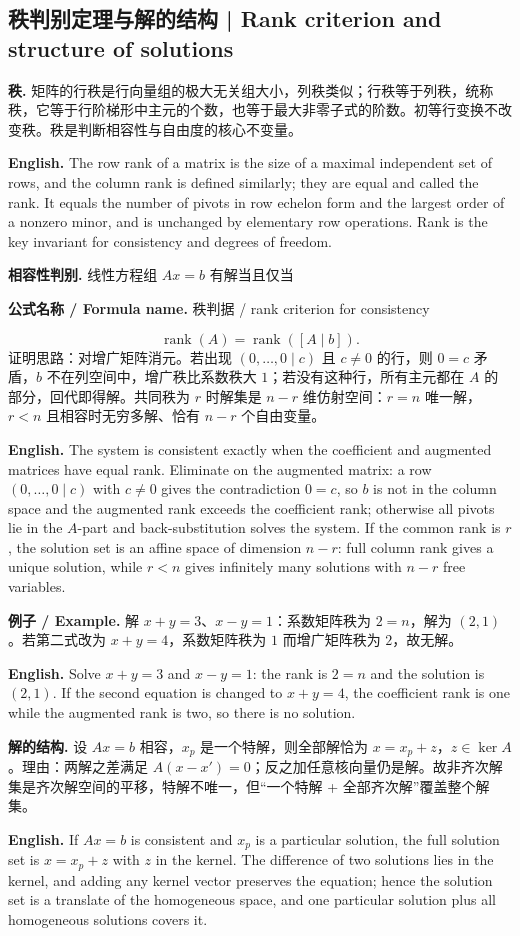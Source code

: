 \documentclass[UTF8,11pt,a4paper]{ctexart}
\newcommand{\EN}[1]{\par\noindent\textbf{English.} #1\par}
\newcommand{\FORMULA}[2]{\par\noindent\textbf{公式名称 / Formula name.} #1 / #2\par}
\newcommand{\EX}[2]{\par\noindent\textbf{例子 / Example.} #1\par\EN{#2}}
\begin{document}
\subsection{秩判别定理与解的结构 | Rank criterion and structure of solutions}
\noindent\textbf{秩.} 矩阵的行秩是行向量组的极大无关组大小，列秩类似；行秩等于列秩，统称秩，它等于行阶梯形中主元的个数，也等于最大非零子式的阶数。初等行变换不改变秩。秩是判断相容性与自由度的核心不变量。
\EN{The row rank of a matrix is the size of a maximal independent set of rows, and the column rank is defined similarly; they are equal and called the rank. It equals the number of pivots in row echelon form and the largest order of a nonzero minor, and is unchanged by elementary row operations. Rank is the key invariant for consistency and degrees of freedom.}
\noindent\textbf{相容性判别.} 线性方程组 $Ax=b$ 有解当且仅当
\FORMULA{秩判据}{rank criterion for consistency}
\[
\operatorname{rank}(A)=\operatorname{rank}([A\mid b]).
\]
证明思路：对增广矩阵消元。若出现 $(0,\dots,0\mid c)$ 且 $c\ne0$ 的行，则 $0=c$ 矛盾，$b$ 不在列空间中，增广秩比系数秩大 $1$；若没有这种行，所有主元都在 $A$ 的部分，回代即得解。共同秩为 $r$ 时解集是 $n-r$ 维仿射空间：$r=n$ 唯一解，$r<n$ 且相容时无穷多解、恰有 $n-r$ 个自由变量。
\EN{The system is consistent exactly when the coefficient and augmented matrices have equal rank. Eliminate on the augmented matrix: a row $(0,\dots,0\mid c)$ with $c\ne0$ gives the contradiction $0=c$, so $b$ is not in the column space and the augmented rank exceeds the coefficient rank; otherwise all pivots lie in the $A$-part and back-substitution solves the system. If the common rank is $r$, the solution set is an affine space of dimension $n-r$: full column rank gives a unique solution, while $r<n$ gives infinitely many solutions with $n-r$ free variables.}
\EX{解 $x+y=3$、$x-y=1$：系数矩阵秩为 $2=n$，解为 $(2,1)$。若第二式改为 $x+y=4$，系数矩阵秩为 $1$ 而增广矩阵秩为 $2$，故无解。}{Solve $x+y=3$ and $x-y=1$: the rank is $2=n$ and the solution is $(2,1)$. If the second equation is changed to $x+y=4$, the coefficient rank is one while the augmented rank is two, so there is no solution.}
\noindent\textbf{解的结构.} 设 $Ax=b$ 相容，$x_p$ 是一个特解，则全部解恰为 $x=x_p+z$，$z\in\ker A$。理由：两解之差满足 $A(x-x')=0$；反之加任意核向量仍是解。故非齐次解集是齐次解空间的平移，特解不唯一，但“一个特解 + 全部齐次解”覆盖整个解集。
\EN{If $Ax=b$ is consistent and $x_p$ is a particular solution, the full solution set is $x=x_p+z$ with $z$ in the kernel. The difference of two solutions lies in the kernel, and adding any kernel vector preserves the equation; hence the solution set is a translate of the homogeneous space, and one particular solution plus all homogeneous solutions covers it.}
\end{document}
